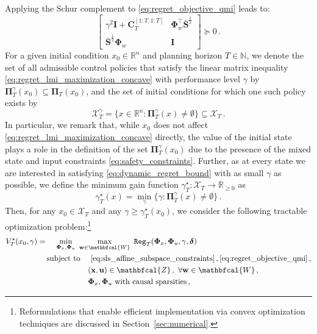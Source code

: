 \documentclass[conference]{IEEEtran}
\DeclareMathOperator*{\st}{subject~to}
\begin{document}
Applying the Schur complement to \eqref{eq:regret_objective_qmi} leads to:
\begin{equation}
    \label{eq:regret_lmi_maximization_concave}
    \begin{bmatrix}
        \gamma^2 \mathbf{I} + \mathbf{C}_{T}^{[1:T, 1:T]} & \bm{\Phi}_w^\top
        \bar{\mathbf{S}}^\frac{1}{2}\\
        \bar{\mathbf{S}}^\frac{1}{2}
        \bm{\Phi}_w
        & \mathbf{I}
    \end{bmatrix} \succeq 0\,.
\end{equation}
For a given initial condition $x_0 \in \mathbb{R}^n$ and planning horizon $T \in \mathbb{N}$, we denote the set of all admissible control policies that satisfy the linear matrix inequality \eqref{eq:regret_lmi_maximization_concave} with performance level $\gamma$ by $\bm{\Pi}_T^\gamma(x_0) \subseteq \bm{\Pi}_T(x_0)$, and the set of initial conditions for which one such policy exists by
\begin{equation}
    \label{eq:X_T_gamma_definition}
    \mathcal{X}_T^\gamma = \{x \in \mathbb{R}^n : \bm{\Pi}_T^\gamma(x) \neq \emptyset\} \subseteq \mathcal{X}_T\,.
\end{equation}
In particular, we remark that, while $x_0$ does not affect \eqref{eq:regret_lmi_maximization_concave} directly, the value of the initial state plays a role in the definition of the set $\bm{\Pi}_T^\gamma(x_0)$ due to the presence of the mixed state and input constraints \eqref{eq:safety_constraints}. Further, as at every state we are interested in satisfying \eqref{eq:dynamic_regret_bound} with as small $\gamma$ as possible, we define the minimum gain function $\gamma_T^\star : \mathcal{X}_T \to \mathbb{R}_{\geq 0}$ as
\begin{equation}
\label{eq:min_gain_gamma}
  \gamma^\star_T(x) = \min_{\gamma} \{\gamma : \bm{\Pi}_T^\gamma(x) \neq \emptyset\}\,.
\end{equation}
Then, for any $x_0 \in \mathcal{X}_T$ and any $\gamma \geq \gamma^\star_T(x_0)$, we consider the following tractable optimization problem:\footnote{Reformulations that enable efficient implementation via convex optimization techniques are discussed in Section~\ref{sec:numerical}.}
\begin{alignat}{3}
    V_T^\star(x_0, \gamma) = & && \hspace{-1.5cm} \min_{\bm{\Phi}_x,\bm{\Phi}_u} ~ \max_{\mathbf{w} \in \mathbfcal{W}} ~ \mathtt{Reg}_T(\bm{\Phi}_x, \bm{\Phi}_u, \gamma, \bm{\delta}) \label{eq:finite_horizon_value_function}\\
        & \st && ~ \eqref{eq:sls_affine_subspace_constraints}\,, \eqref{eq:regret_objective_qmi}\,, \nonumber\\ %
        & && (\mathbf{x}, \mathbf{u}) \in \mathbfcal{Z}\,, ~ \forall \mathbf{w} \in \mathbfcal{W}\,, \nonumber\\
        & && \bm{\Phi}_x, \bm{\Phi}_u \text{ with causal sparsities} \nonumber \,,%
\end{alignat}
\end{document}
